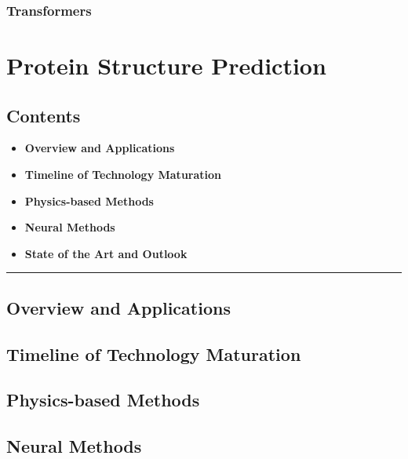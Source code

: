 \hypertarget{transformers-1}{%
\subsubsection{Transformers}\label{transformers-1}}

\hypertarget{protein-structure-prediction-1}{%
\section{Protein Structure
Prediction}\label{protein-structure-prediction-1}}

\hypertarget{contents-10}{%
\subsection{Contents}\label{contents-10}}

\begin{itemize}
\tightlist
\item
  \textbf{Overview and Applications}
\item
  \textbf{Timeline of Technology Maturation}
\item
  \textbf{Physics-based Methods}
\item
  \textbf{Neural Methods}
\item
  \textbf{State of the Art and Outlook}
\end{itemize}

\begin{center}\rule{0.5\linewidth}{0.5pt}\end{center}

\hypertarget{overview-and-applications}{%
\subsection{Overview and Applications}\label{overview-and-applications}}

\hypertarget{timeline-of-technology-maturation}{%
\subsection{Timeline of Technology
Maturation}\label{timeline-of-technology-maturation}}

\hypertarget{physics-based-methods}{%
\subsection{Physics-based Methods}\label{physics-based-methods}}

\hypertarget{neural-methods}{%
\subsection{Neural Methods}\label{neural-methods}}

